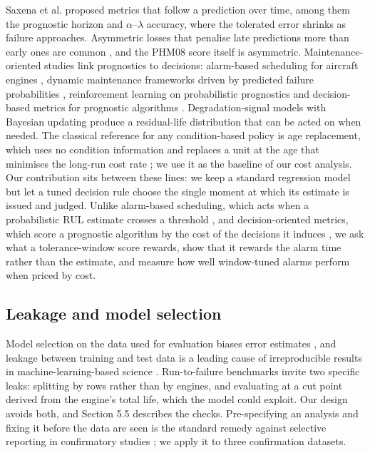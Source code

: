 \documentclass[a4paper,fleqn,doubleblind]{cas-dc}
\begin{document}
Saxena et al. \cite{saxena2010} proposed metrics that follow a prediction over time, among them the prognostic horizon and $\alpha$--$\lambda$ accuracy, where the tolerated error shrinks as failure approaches. Asymmetric losses that penalise late predictions more than early ones are common \cite{rengasamy2020}, and the PHM08 score itself is asymmetric. Maintenance-oriented studies link prognostics to decisions: alarm-based scheduling for aircraft engines \cite{depater2022}, dynamic maintenance frameworks driven by predicted failure probabilities \cite{nguyen2019,mitici2023}, reinforcement learning on probabilistic prognostics \cite{lee2023} and decision-based metrics for prognostic algorithms \cite{kamariotis2024}. Degradation-signal models with Bayesian updating \cite{gebraeel2005} produce a residual-life distribution that can be acted on when needed. The classical reference for any condition-based policy is age replacement, which uses no condition information and replaces a unit at the age that minimises the long-run cost rate \cite{barlow1960}; we use it as the baseline of our cost analysis. Our contribution sits between these lines: we keep a standard regression model but let a tuned decision rule choose the single moment at which its estimate is issued and judged. Unlike alarm-based scheduling, which acts when a probabilistic RUL estimate crosses a threshold \cite{depater2022}, and decision-oriented metrics, which score a prognostic algorithm by the cost of the decisions it induces \cite{kamariotis2024}, we ask what a tolerance-window score rewards, show that it rewards the alarm time rather than the estimate, and measure how well window-tuned alarms perform when priced by cost.

\subsection{Leakage and model selection}

Model selection on the data used for evaluation biases error estimates \cite{varma2006}, and leakage between training and test data is a leading cause of irreproducible results in machine-learning-based science \cite{kapoor2023}. Run-to-failure benchmarks invite two specific leaks: splitting by rows rather than by engines, and evaluating at a cut point derived from the engine's total life, which the model could exploit. Our design avoids both, and Section 5.5 describes the checks. Pre-specifying an analysis and fixing it before the data are seen is the standard remedy against selective reporting in confirmatory studies \cite{nosek2018}; we apply it to three confirmation datasets.
\end{document}

